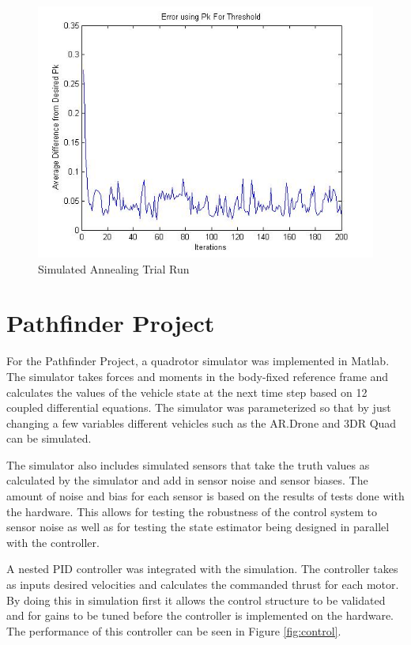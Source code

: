 \documentclass{article}
\begin{document}
\begin{figure}[h]
\includegraphics[width=1\textwidth]{avg_err}
\caption{Simulated Annealing Trial Run}
\label{fig:avg_err}
\end{figure}

\section{Pathfinder Project}

For the Pathfinder Project, a quadrotor simulator was implemented in Matlab. The simulator takes forces and moments in the body-fixed reference frame and calculates the values of the vehicle state at the next time step based on 12 coupled differential equations. The simulator was parameterized so that by just changing a few variables different vehicles such as the AR.Drone and 3DR Quad can be simulated.

The simulator also includes simulated sensors that take the truth values as calculated by the simulator and add in sensor noise and sensor biases. The amount of noise and bias for each sensor is based on the results of tests done with the hardware. This allows for testing the robustness of the control system to sensor noise as well as for testing the state estimator being designed in parallel with the controller.

A nested PID controller was integrated with the simulation. The controller takes as inputs desired velocities and calculates the commanded thrust for each motor. By doing this in simulation first it allows the control structure to be validated and for gains to be tuned before the controller is implemented on the hardware. The performance of this controller can be seen in Figure \ref{fig:control}.
\end{document}
